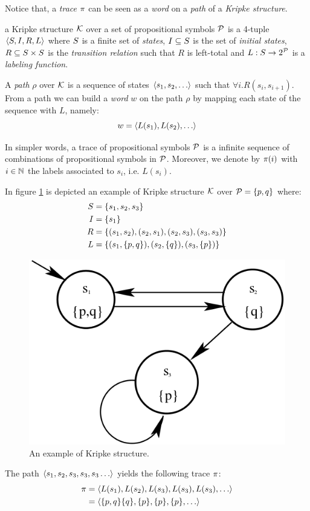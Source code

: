 Notice that, a \emph{trace} $\pi$ can be seen as a \emph{word} on a \emph{path} of a \emph{Kripke structure}.
\begin{definition}\label{kripke}
	a Kripke structure $\mathcal{K}$ over a set of propositional symbols $\mathcal{P}$ is a 4-tuple $\langle S, I, R, L \rangle$ where $S$ is a finite set of \emph{states}, $I\subseteq S$ is the set of \emph{initial states}, $R \subseteq S \times S$ is the \emph{transition relation} such that $R$ is left-total and $L: S \to 2^{\mathcal{P}}$ is a \emph{labeling function}.
\end{definition}
A \emph{path} $\rho$ over $\mathcal{K}$ is a sequence of states $\tup{s_1, s_2, \dots}$ such that $\forall i. R(s_i, s_{i+1})$. From a path we can build a \emph{word} $w$ on the path $\rho$ by  
mapping each state of the sequence with $L$, namely:
\[
w = \tup{L(s_1), L(s_2), \dots}
\]

In simpler words, a trace of propositional symbols $\mathcal{P}$ is a infinite sequence of combinations of propositional symbols in $\mathcal{P}$. Moreover, we denote by $\pi(i)$ with $i\in\mathbb{N}$ the labels associated to $s_i$, i.e. $L(s_i)$.
\begin{example}\label{kripke-example}
	In figure \ref{kripke-fig-example} is depicted an example of Kripke structure $\mathcal{K}$ over $\mathcal{P} = \{p, q\}$ where:
	\begin{align*}
	S &= \{s_1, s_2, s_3\}\\
	I &= \{s_1\}\\
	R &= \{(s_1, s_2), (s_2, s_1), (s_2, s_3), (s_3, s_3)\}\\
	L &= \{(s_1, \{p, q\}), (s_2, \{q\}), (s_3, \{p\})\}
	\end{align*}
	 
	\begin{figure}[h]
		\centering	
		\includegraphics[width=.5\linewidth]{images/KripkeStructureExample}
		\caption{\label{kripke-fig-example}An example of Kripke structure.}
	\end{figure}
	
	The path $\tup{s_1, s_2, s_3, s_3, s_3\dots}$ yields the following trace $\pi$:
	\begin{align*}
	\trace &= \tup{L(s_1), L(s_2), L(s_3), L(s_3), L(s_3),\dots} \\
		&= \tup{\set{p, q}\set{q}, \set{p}, \set{p},\set{p}, \dots}
	\end{align*}
\end{example}




